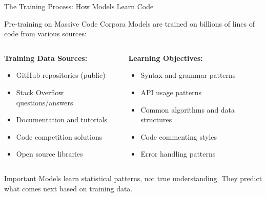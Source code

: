 \documentclass{beamer}
\begin{document}
\begin{frame}[t]{The Training Process: How Models Learn Code}
    \begin{block}{Pre-training on Massive Code Corpora}
        Models are trained on billions of lines of code from various sources:
    \end{block}
    
    \begin{columns}[t]
        \begin{column}{0.5\textwidth}
            \textbf{Training Data Sources:}
            \begin{itemize}
                \item GitHub repositories (public)
                \item Stack Overflow questions/answers
                \item Documentation and tutorials
                \item Code competition solutions
                \item Open source libraries
            \end{itemize}
        \end{column}
        \begin{column}{0.5\textwidth}
            \textbf{Learning Objectives:}
            \begin{itemize}
                \item Syntax and grammar patterns
                \item API usage patterns
                \item Common algorithms and data structures
                \item Code commenting styles
                \item Error handling patterns
            \end{itemize}
        \end{column}
    \end{columns}
    
    \vspace{0.3cm}
    \begin{alertblock}{Important}
        Models learn statistical patterns, not true understanding. They predict what comes next based on training data.
    \end{alertblock}
\end{frame}
\end{document}
